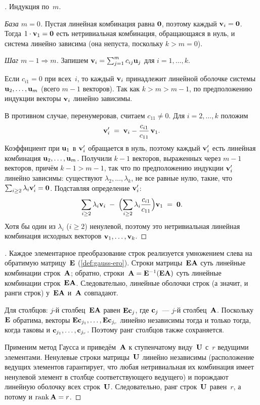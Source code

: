 \begin{proof}[]
Индукция по~$m$.

\emph{База $m = 0$.} Пустая линейная комбинация равна $\mathbf{0}$,
поэтому каждый $\mathbf{v}_i = \mathbf{0}$. Тогда $1 \cdot \mathbf{v}_1 = \mathbf{0}$
есть нетривиальная комбинация, обращающаяся в нуль, и система
линейно зависима (она непуста, поскольку $k > m = 0$).

\emph{Шаг $m - 1 \Rightarrow m$.} Запишем
$\mathbf{v}_i = \sum_{j=1}^{m} c_{ij} \mathbf{u}_j$ для $i = 1, \dots, k$.

Если $c_{i1} = 0$ при всех~$i$, то каждый $\mathbf{v}_i$ принадлежит
линейной оболочке системы $\mathbf{u}_2, \dots, \mathbf{u}_m$ (всего
$m - 1$ векторов). Так как $k > m > m - 1$, по предположению индукции
векторы $\mathbf{v}_i$ линейно зависимы.

В противном случае, перенумеровав, считаем $c_{11} \neq 0$. Для
$i = 2, \dots, k$ положим
\[
  \mathbf{v}'_i \;=\; \mathbf{v}_i - \frac{c_{i1}}{c_{11}}\,\mathbf{v}_1.
\]
Коэффициент при $\mathbf{u}_1$ в $\mathbf{v}'_i$ обращается в нуль, поэтому
каждый $\mathbf{v}'_i$ есть линейная комбинация
$\mathbf{u}_2, \dots, \mathbf{u}_m$. Получили $k - 1$ векторов,
выраженных через $m - 1$ векторов, причём $k - 1 > m - 1$, так что по
предположению индукции $\mathbf{v}'_i$ линейно зависимы: существуют
$\lambda_2, \dots, \lambda_k$, не все равные нулю, такие, что
$\sum_{i \ge 2} \lambda_i \mathbf{v}'_i = \mathbf{0}$. Подставляя
определение $\mathbf{v}'_i$:
\[
  \sum_{i \ge 2} \lambda_i \mathbf{v}_i
  \;-\; \Bigl(\sum_{i \ge 2} \lambda_i \frac{c_{i1}}{c_{11}}\Bigr) \mathbf{v}_1
  \;=\; \mathbf{0}.
\]
Хотя бы один из $\lambda_i$ ($i \ge 2$) ненулевой, поэтому это
нетривиальная линейная комбинация исходных векторов
$\mathbf{v}_1, \dots, \mathbf{v}_k$.
\end{proof}

\begin{proof}[]
Каждое элементарное преобразование строк реализуется умножением слева
на обратимую матрицу~$\mathbf{E}$ (\cref{def:gauss-ero}). Строки
матрицы~$\mathbf{E}\mathbf{A}$ суть линейные комбинации строк~$\mathbf{A}$;
обратно, строки~$\mathbf{A} = \mathbf{E}^{-1}(\mathbf{E}\mathbf{A})$ суть линейные
комбинации строк~$\mathbf{E}\mathbf{A}$. Следовательно, линейные оболочки
строк (а значит, и ранги строк) у~$\mathbf{E}\mathbf{A}$ и~$\mathbf{A}$
совпадают.

Для столбцов: $j$-й столбец~$\mathbf{E}\mathbf{A}$ равен $\mathbf{E}\mathbf{c}_j$,
где $\mathbf{c}_j$~--- $j$-й столбец~$\mathbf{A}$. Поскольку~$\mathbf{E}$
обратима, векторы $\mathbf{E}\mathbf{c}_{j_1}, \dots, \mathbf{E}\mathbf{c}_{j_r}$
линейно независимы тогда и только тогда, когда таковы и
$\mathbf{c}_{j_1}, \dots, \mathbf{c}_{j_r}$. Поэтому ранг столбцов также
сохраняется.

Применим метод Гаусса и приведём~$\mathbf{A}$ к ступенчатому
виду~$\mathbf{U}$ с~$r$ ведущими элементами. Ненулевые строки
матрицы~$\mathbf{U}$ линейно независимы (расположение ведущих элементов
гарантирует, что любая нетривиальная их комбинация имеет ненулевой
элемент в столбце соответствующего ведущего) и порождают линейную
оболочку всех строк~$\mathbf{U}$. Следовательно, ранг строк~$\mathbf{U}$
равен~$r$, а потому и $\operatorname{rank} \mathbf{A} = r$.
\end{proof}


